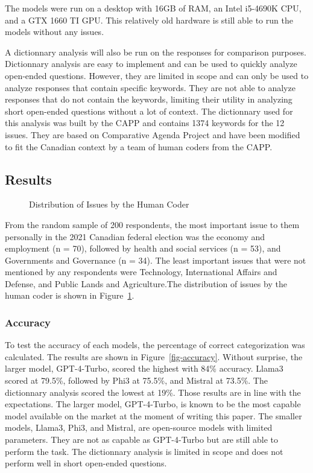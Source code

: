 \documentclass[
  authoryear,
  preprint,
  3p]{elsarticle}
\begin{document}
The models were run on a desktop with 16GB of RAM, an Intel i5-4690K
CPU, and a GTX 1660 TI GPU. This relatively old hardware is still able
to run the models without any issues.

A dictionnary analysis will also be run on the responses for comparison
purposes. Dictionnary analysis are easy to implement and can be used to
quickly analyze open-ended questions. However, they are limited in scope
and can only be used to analyze responses that contain specific
keywords. They are not able to analyze responses that do not contain the
keywords, limiting their utility in analyzing short open-ended questions
without a lot of context. The dictionnary used for this analysis was
built by the CAPP and contains 1374 keywords for the 12 issues. They are
based on \citet{sevenans_etal14} Comparative Agenda Project and have
been modified to fit the Canadian context by a team of human coders from
the CAPP.

\subsection{Results}\label{results}

\begin{figure}


\caption{\label{fig-distribution}Distribution of Issues by the Human
Coder}

\end{figure}%

From the random sample of 200 respondents, the most important issue to
them personally in the 2021 Canadian federal election was the economy
and employment (n = 70), followed by health and social services (n =
53), and Governments and Governance (n = 34). The least important issues
that were not mentioned by any respondents were Technology,
International Affairs and Defense, and Public Lands and Agriculture.The
distribution of issues by the human coder is shown in
Figure~\ref{fig-distribution}.

\subsubsection{Accuracy}\label{accuracy}

To test the accuracy of each models, the percentage of correct
categorization was calculated. The results are shown in
Figure~\ref{fig-accuracy}. Without surprise, the larger model,
GPT-4-Turbo, scored the highest with 84\% accuracy. Llama3 scored at
79.5\%, followed by Phi3 at 75.5\%, and Mistral at 73.5\%. The
dictionnary analysis scored the lowest at 19\%. Those results are in
line with the expectations. The larger model, GPT-4-Turbo, is known to
be the most capable model available on the market at the moment of
writing this paper. The smaller models, Llama3, Phi3, and Mistral, are
open-source models with limited parameters. They are not as capable as
GPT-4-Turbo but are still able to perform the task. The dictionnary
analysis is limited in scope and does not perform well in short
open-ended questions.
\end{document}
